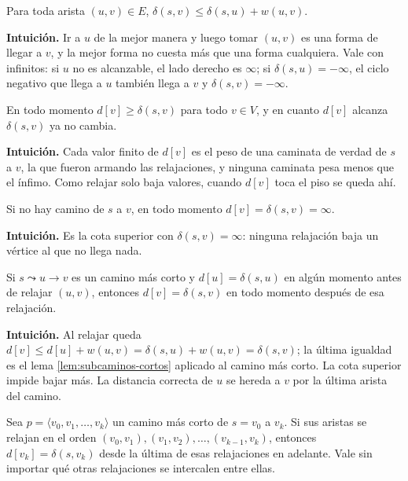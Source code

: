 \documentclass[11pt,letterpaper]{article}
\begin{document}
\begin{proposicion}
  \label{prop:triangulo}
  Para toda arista $(u, v) \in E$,
  $\delta(s, v) \le \delta(s, u) + w(u, v)$.
\end{proposicion}

\textbf{Intuición.} Ir a $u$ de la mejor manera y luego tomar
$(u, v)$ es una forma de llegar a $v$, y la mejor forma no cuesta más
que una forma cualquiera. Vale con infinitos: si $u$ no es
alcanzable, el lado derecho es $\infty$; si $\delta(s, u) = -\infty$,
el ciclo negativo que llega a $u$ también llega a $v$ y
$\delta(s, v) = -\infty$.

\begin{proposicion}
  \label{prop:cota-superior}
  En todo momento $d[v] \ge \delta(s, v)$ para todo $v \in V$, y en
  cuanto $d[v]$ alcanza $\delta(s, v)$ ya no cambia.
\end{proposicion}

\textbf{Intuición.} Cada valor finito de $d[v]$ es el peso de una
caminata de verdad de $s$ a $v$, la que fueron armando las
relajaciones, y ninguna caminata pesa menos que el ínfimo. Como
relajar solo baja valores, cuando $d[v]$ toca el piso se queda ahí.

\begin{proposicion}
  \label{prop:sin-camino}
  Si no hay camino de $s$ a $v$, en todo momento
  $d[v] = \delta(s, v) = \infty$.
\end{proposicion}

\textbf{Intuición.} Es la cota superior con $\delta(s, v) = \infty$:
ninguna relajación baja un vértice al que no llega nada.

\begin{proposicion}
  \label{prop:convergencia}
  Si $s \leadsto u \to v$ es un camino más corto y
  $d[u] = \delta(s, u)$ en algún momento antes de relajar $(u, v)$,
  entonces $d[v] = \delta(s, v)$ en todo momento después de esa
  relajación.
\end{proposicion}

\textbf{Intuición.} Al relajar queda
$d[v] \le d[u] + w(u, v) = \delta(s, u) + w(u, v) = \delta(s, v)$; la
última igualdad es el lema \ref{lem:subcaminos-cortos} aplicado al
camino más corto. La cota superior impide bajar más. La distancia
correcta de $u$ se hereda a $v$ por la última arista del camino.

\begin{proposicion}
  \label{prop:relajacion-caminos}
  Sea $p = \langle v_0, v_1, \dots, v_k\rangle$ un camino más corto de
  $s = v_0$ a $v_k$. Si sus aristas se relajan en el orden
  $(v_0, v_1), (v_1, v_2), \dots, (v_{k-1}, v_k)$, entonces
  $d[v_k] = \delta(s, v_k)$ desde la última de esas relajaciones en
  adelante. Vale sin importar qué otras relajaciones se intercalen
  entre ellas.
\end{proposicion}
\end{document}
